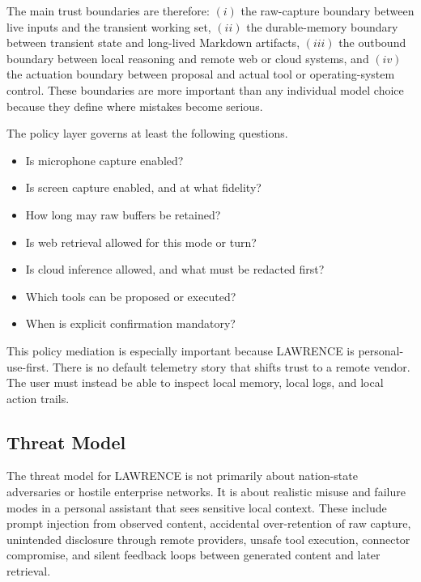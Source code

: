 \documentclass[conference]{IEEEtran}
\begin{document}
The main trust boundaries are therefore: $(i)$ the raw-capture boundary between live inputs and the transient working set, $(ii)$ the durable-memory boundary between transient state and long-lived Markdown artifacts, $(iii)$ the outbound boundary between local reasoning and remote web or cloud systems, and $(iv)$ the actuation boundary between proposal and actual tool or operating-system control. These boundaries are more important than any individual model choice because they define where mistakes become serious.

The policy layer governs at least the following questions.

\begin{itemize}
\item Is microphone capture enabled?
\item Is screen capture enabled, and at what fidelity?
\item How long may raw buffers be retained?
\item Is web retrieval allowed for this mode or turn?
\item Is cloud inference allowed, and what must be redacted first?
\item Which tools can be proposed or executed?
\item When is explicit confirmation mandatory?
\end{itemize}

This policy mediation is especially important because LAWRENCE is personal-use-first. There is no default telemetry story that shifts trust to a remote vendor. The user must instead be able to inspect local memory, local logs, and local action trails.

\subsection{Threat Model}
The threat model for LAWRENCE is not primarily about nation-state adversaries or hostile enterprise networks. It is about realistic misuse and failure modes in a personal assistant that sees sensitive local context. These include prompt injection from observed content, accidental over-retention of raw capture, unintended disclosure through remote providers, unsafe tool execution, connector compromise, and silent feedback loops between generated content and later retrieval.
\end{document}
